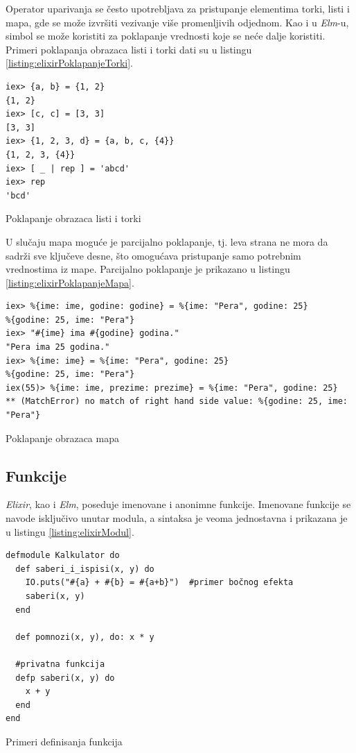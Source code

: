 \documentclass[12pt,oneside]{memoir}
\begin{document}
Operator uparivanja se često upotrebljava za pristupanje elementima torki, listi i mapa,
gde se može izvršiti vezivanje više promenljivih odjednom. Kao i u \emph{Elm}-u, simbol 
\texttt{\textbf{\textunderscore}} se može koristiti za poklapanje vrednosti koje se neće
dalje koristiti. Primeri poklapanja obrazaca listi i torki dati su u listingu
\ref{listing:elixirPoklapanjeTorki}.
\begin{listing}[!h]
\begin{verbatim}
iex> {a, b} = {1, 2}
{1, 2}
iex> [c, c] = [3, 3]
[3, 3]
iex> {1, 2, 3, d} = {a, b, c, {4}}
{1, 2, 3, {4}}
iex> [ _ | rep ] = 'abcd'
iex> rep
'bcd'
\end{verbatim}
\caption{Poklapanje obrazaca listi i torki}
\label{listing:elixirPoklapanjeTorki}
\end{listing}

U slučaju mapa moguće je parcijalno poklapanje, tj. leva strana ne mora da sadrži sve
ključeve desne, što omogućava pristupanje samo potrebnim vrednostima iz mape. Parcijalno
poklapanje je prikazano u listingu \ref{listing:elixirPoklapanjeMapa}.
\begin{listing}[!h]
\begin{verbatim}
iex> %{ime: ime, godine: godine} = %{ime: "Pera", godine: 25}
%{godine: 25, ime: "Pera"}
iex> "#{ime} ima #{godine} godina."
"Pera ima 25 godina."
iex> %{ime: ime} = %{ime: "Pera", godine: 25}
%{godine: 25, ime: "Pera"}
iex(55)> %{ime: ime, prezime: prezime} = %{ime: "Pera", godine: 25}
** (MatchError) no match of right hand side value: %{godine: 25, ime: "Pera"}
\end{verbatim}
\caption{Poklapanje obrazaca mapa}
\label{listing:elixirPoklapanjeMapa}
\end{listing}

\subsection{Funkcije}
\emph{Elixir}, kao i \emph{Elm}, poseduje imenovane i anonimne funkcije. Imenovane funkcije se navode
isključivo unutar modula, a sintaksa je veoma jednostavna i prikazana je u listingu
\ref{listing:elixirModul}.
\begin{listing}[!h]
\begin{verbatim}
defmodule Kalkulator do
  def saberi_i_ispisi(x, y) do
    IO.puts("#{a} + #{b} = #{a+b}")  #primer bočnog efekta
    saberi(x, y)
  end

  def pomnozi(x, y), do: x * y

  #privatna funkcija
  defp saberi(x, y) do 
    x + y
  end
end
\end{verbatim}
\caption{Primeri definisanja funkcija}
\label{listing:elixirModul}
\end{listing}
\end{document}
